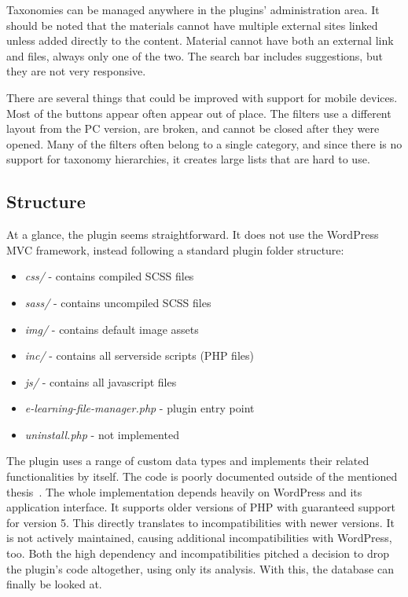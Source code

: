 \documentclass[
  digital,     %
  oneside,     %
  nosansbold,  %
  colorbold, %
  lof,         %
  lot,         %
]{fithesis4}
\begin{document}
Taxonomies can be managed anywhere in the plugins' administration area. It should be noted that the materials cannot have multiple external sites linked unless added directly to the content. Material cannot have both an external link and files, always only one of the two. The search bar includes suggestions, but they are not very responsive.

There are several things that could be improved with support for mobile devices. Most of the buttons appear often appear out of place. The filters use a different layout from the PC version, are broken, and cannot be closed after they were opened. Many of the filters often belong to a single category, and since there is no support for taxonomy hierarchies, it creates large lists that are hard to use.

\subsection{Structure}
\label{subsect:plugin-structure}

At a glance, the plugin seems straightforward. It does not use the WordPress MVC framework, instead following a standard  plugin folder structure: \begin{itemize}
	\item \textit{css/} - contains compiled SCSS files
	\item \textit{sass/} - contains uncompiled SCSS files
	\item \textit{img/} - contains default image assets
	\item \textit{inc/} - contains all serverside scripts (PHP files)
	\item \textit{js/} - contains all javascript files
	\item \textit{e-learning-file-manager.php} - plugin entry point
	\item \textit{uninstall.php} - not implemented
\end{itemize}

The plugin uses a range of custom data types and implements their related functionalities by itself. The code is poorly documented outside of the mentioned thesis~\cite{lang18}. The whole implementation depends heavily on WordPress and its application interface. It supports older versions of PHP with guaranteed support for version 5. This directly translates to incompatibilities with newer versions. It is not actively maintained, causing additional incompatibilities with WordPress, too. Both the high dependency and incompatibilities pitched a decision to drop the plugin's code altogether, using only its analysis. With this, the database can finally be looked at.
\end{document}
